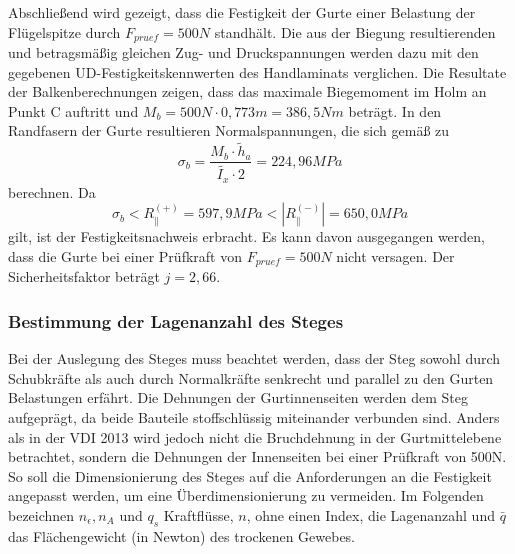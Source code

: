 \noindent Abschließend wird gezeigt, dass die Festigkeit der Gurte einer Belastung der Flügelspitze durch $ F_{pruef}=500N $ standhält. Die aus der Biegung resultierenden und betragsmäßig gleichen Zug- und Druckspannungen werden dazu mit den gegebenen UD-Festigkeitskennwerten des Handlaminats verglichen. Die Resultate der Balkenberechnungen zeigen, dass das maximale Biegemoment im Holm an Punkt C auftritt und $ M_{b}=500N\cdot 0,773m=386,5Nm $ beträgt. In den Randfasern der Gurte resultieren Normalspannungen, die sich gemäß \cite{item15} zu\\
\begin{equation}
	\sigma_{b}=\frac{M_{b}\cdot \tilde{h}_{a}}{\tilde{I_{x}}\cdot 2}=224,96MPa
\end{equation} 
berechnen. Da 
\begin{equation}
	\sigma_{b}< R^{(+)}_{\|}=597,9 MPa < |R^{(-)}_{\|}| =650,0 MPa
\end{equation} 
gilt, ist der Festigkeitsnachweis erbracht. Es kann davon ausgegangen werden, dass die Gurte bei einer Prüfkraft von $ F_{pruef}=500N $ nicht versagen. Der Sicherheitsfaktor beträgt $ j=2,66 $. \\

\subsubsection{Bestimmung der Lagenanzahl des Steges}\label{LagenSteg}
Bei der Auslegung des Steges muss beachtet werden, dass der Steg sowohl durch Schubkräfte als auch durch Normalkräfte senkrecht und parallel zu den Gurten Belastungen erfährt. Die Dehnungen der Gurtinnenseiten werden dem Steg aufgeprägt, da beide Bauteile stoffschlüssig miteinander verbunden sind. Anders als in der VDI 2013 wird jedoch nicht die Bruchdehnung in der Gurtmittelebene betrachtet, sondern die Dehnungen der Innenseiten bei einer Prüfkraft von 500N. So soll die Dimensionierung des Steges auf die Anforderungen an die Festigkeit angepasst werden, um eine Überdimensionierung zu vermeiden. Im Folgenden bezeichnen $ n_{\epsilon}, n_{A} $ und $ q_{s} $ Kraftflüsse, $ n $, ohne einen Index, die Lagenanzahl und $ \bar{q} $ das Flächengewicht (in Newton) des trockenen Gewebes.\\


